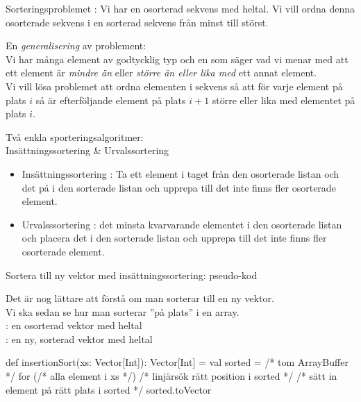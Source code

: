 

\ifkompendium\else



\begin{Slide}{Sorteringsproblemet}
: Vi har en osorterad sekvens med heltal. Vi vill ordna denna osorterade sekvens i en sorterad sekvens från minst till störst.
\pause

\vspace{2em}
En \emph{generalisering} av problement: \\ \vspace{1em} Vi har många element av godtycklig typ och en  som säger vad vi menar med att ett element är \emph{mindre än} eller \emph{större än eller lika med} ett annat element. \\ \vspace{1em}
Vi vill lösa problemet att ordna elementen i sekvens så att för varje element på plats $i$ så är efterföljande element på plats $i + 1$ större eller lika med elementet på plats $i$.

\end{Slide} 

\begin{Slide}{Två enkla sporteringsalgoritmer: \\ Insättningssortering \& Urvalssortering}
\begin{itemize}
\item Insättningssortering : Ta ett element i taget från den osorterade listan och  det på  i den sorterade listan och upprepa till det inte finns fler osorterade element. 
\pause
\item Urvalsssortering :  det minsta kvarvarande elementet i den osorterade listan och placera det  i den sorterade listan och upprepa till det inte finns fler osorterade element. 
\end{itemize}
\end{Slide} 


\begin{Slide}{Sortera till ny vektor med insättningssortering: pseudo-kod}

{\SlideFontSmall Det är nog lättare att förstå  om man sorterar till en ny vektor. \\ Vi ska sedan se hur man sorterar ''på plats''  i en  array.\\} \vspace{1em}
: en osorterad vektor med heltal \\
: en ny, sorterad vektor med heltal
\begin{Code}
def insertionSort(xs: Vector[Int]): Vector[Int] = {
  val sorted = /* tom ArrayBuffer */
  for (/* alla element i xs */) {
     /* linjärsök rätt position i sorted */
     /* sätt in element på rätt plats i sorted */ 
  }
  sorted.toVector
}
\end{Code}
\end{Slide}

